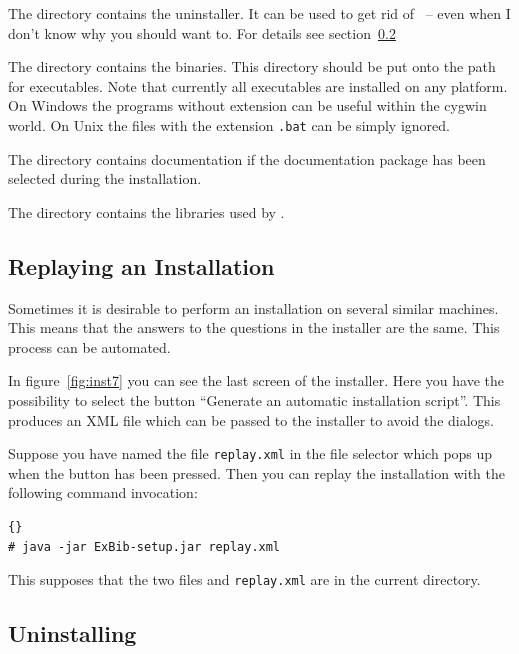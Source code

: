 The directory  contains the uninstaller. It can be
used to get rid of \ExBib\ -- even when I don't know why you should
want to. For details see section~\ref{sec:uninst}

The directory  contains the binaries. This directory should
be put onto the path for executables. Note that currently all
executables are installed on any platform. On Windows the programs
without extension can be useful within the cygwin world. On Unix the
files with the extension \verb|.bat| can be simply ignored.

The directory  contains documentation if the documentation
package has been selected during the installation.

The directory  contains the libraries used by \ExBib.
%
%

\subsection{Replaying an Installation}\label{sec:replay}

Sometimes it is desirable to perform an installation on several
similar machines. This means that the answers to the questions in the
installer are the same. This process can be automated.

In figure~\ref{fig:inst7} you can see the last screen of the
installer. Here you have the possibility to select the button
``Generate an automatic installation script''. This produces an XML
file which can be passed to the installer to avoid the
dialogs.

Suppose you have named the file \texttt{replay.xml} in the file
selector which pops up when the button has been pressed. Then you can
replay the installation with the following command invocation:

\begin{lstlisting}{}
# java -jar ExBib-setup.jar replay.xml
\end{lstlisting}

This supposes that the two files  and
\texttt{replay.xml} are in the current directory.

\subsection{Uninstalling \ExBib}\label{sec:uninst}

